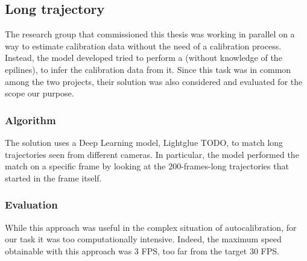 \subsection{Long trajectory}
\label{sec:match:traj}

The research group that commissioned this thesis was working in parallel on a way to estimate calibration data without the need of a calibration process.
Instead, the model developed tried to perform a \match* (without knowledge of the epilines), to infer the calibration data from it.
Since this task was in common among the two projects, their solution was also considered and evaluated for the scope our purpose.

\subsubsection{Algorithm}

The solution uses a Deep Learning model, Lightglue TODO, to match long trajectories seen from different cameras.
In particular, the model performed the match on a specific frame by looking at the 200-frames-long trajectories that started in the frame itself.

\subsubsection{Evaluation}

While this approach was useful in the complex situation of autocalibration, for our task it was too computationally intensive.
Indeed, the maximum speed obtainable with this approach was 3 FPS, too far from the target 30 FPS.

